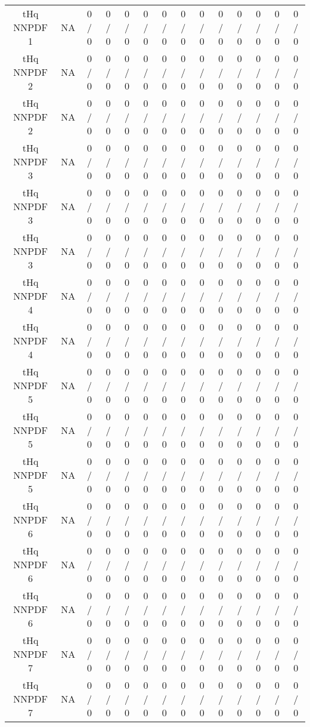 \documentclass[10pt]{article}
\begin{document}
\begin{table}[htbp]
\begin{center}
\begin{tabular}{|c|c|c|c|c|c|c|c|c|c|c|c|c|c|}
  tHq NNPDF 1 &    NA    & 0 / 0 & 0 / 0 & 0 / 0 & 0 / 0 & 0 / 0 & 0 / 0 & 0 / 0 & 0 / 0 & 0 / 0 & 0 / 0 & 0 / 0 & 0 / 0 \\ 
  tHq NNPDF 2 &    NA    & 0 / 0 & 0 / 0 & 0 / 0 & 0 / 0 & 0 / 0 & 0 / 0 & 0 / 0 & 0 / 0 & 0 / 0 & 0 / 0 & 0 / 0 & 0 / 0 \\ 
  tHq NNPDF 2 &    NA    & 0 / 0 & 0 / 0 & 0 / 0 & 0 / 0 & 0 / 0 & 0 / 0 & 0 / 0 & 0 / 0 & 0 / 0 & 0 / 0 & 0 / 0 & 0 / 0 \\ 
  tHq NNPDF 3 &    NA    & 0 / 0 & 0 / 0 & 0 / 0 & 0 / 0 & 0 / 0 & 0 / 0 & 0 / 0 & 0 / 0 & 0 / 0 & 0 / 0 & 0 / 0 & 0 / 0 \\ 
  tHq NNPDF 3 &    NA    & 0 / 0 & 0 / 0 & 0 / 0 & 0 / 0 & 0 / 0 & 0 / 0 & 0 / 0 & 0 / 0 & 0 / 0 & 0 / 0 & 0 / 0 & 0 / 0 \\ 
  tHq NNPDF 3 &    NA    & 0 / 0 & 0 / 0 & 0 / 0 & 0 / 0 & 0 / 0 & 0 / 0 & 0 / 0 & 0 / 0 & 0 / 0 & 0 / 0 & 0 / 0 & 0 / 0 \\ 
  tHq NNPDF 4 &    NA    & 0 / 0 & 0 / 0 & 0 / 0 & 0 / 0 & 0 / 0 & 0 / 0 & 0 / 0 & 0 / 0 & 0 / 0 & 0 / 0 & 0 / 0 & 0 / 0 \\ 
  tHq NNPDF 4 &    NA    & 0 / 0 & 0 / 0 & 0 / 0 & 0 / 0 & 0 / 0 & 0 / 0 & 0 / 0 & 0 / 0 & 0 / 0 & 0 / 0 & 0 / 0 & 0 / 0 \\ 
  tHq NNPDF 5 &    NA    & 0 / 0 & 0 / 0 & 0 / 0 & 0 / 0 & 0 / 0 & 0 / 0 & 0 / 0 & 0 / 0 & 0 / 0 & 0 / 0 & 0 / 0 & 0 / 0 \\ 
  tHq NNPDF 5 &    NA    & 0 / 0 & 0 / 0 & 0 / 0 & 0 / 0 & 0 / 0 & 0 / 0 & 0 / 0 & 0 / 0 & 0 / 0 & 0 / 0 & 0 / 0 & 0 / 0 \\ 
  tHq NNPDF 5 &    NA    & 0 / 0 & 0 / 0 & 0 / 0 & 0 / 0 & 0 / 0 & 0 / 0 & 0 / 0 & 0 / 0 & 0 / 0 & 0 / 0 & 0 / 0 & 0 / 0 \\ 
  tHq NNPDF 6 &    NA    & 0 / 0 & 0 / 0 & 0 / 0 & 0 / 0 & 0 / 0 & 0 / 0 & 0 / 0 & 0 / 0 & 0 / 0 & 0 / 0 & 0 / 0 & 0 / 0 \\ 
  tHq NNPDF 6 &    NA    & 0 / 0 & 0 / 0 & 0 / 0 & 0 / 0 & 0 / 0 & 0 / 0 & 0 / 0 & 0 / 0 & 0 / 0 & 0 / 0 & 0 / 0 & 0 / 0 \\ 
  tHq NNPDF 6 &    NA    & 0 / 0 & 0 / 0 & 0 / 0 & 0 / 0 & 0 / 0 & 0 / 0 & 0 / 0 & 0 / 0 & 0 / 0 & 0 / 0 & 0 / 0 & 0 / 0 \\ 
  tHq NNPDF 7 &    NA    & 0 / 0 & 0 / 0 & 0 / 0 & 0 / 0 & 0 / 0 & 0 / 0 & 0 / 0 & 0 / 0 & 0 / 0 & 0 / 0 & 0 / 0 & 0 / 0 \\ 
  tHq NNPDF 7 &    NA    & 0 / 0 & 0 / 0 & 0 / 0 & 0 / 0 & 0 / 0 & 0 / 0 & 0 / 0 & 0 / 0 & 0 / 0 & 0 / 0 & 0 / 0 & 0 / 0 \\ 

\end{tabular}
\end{center}
\end{table}
\end{document}
